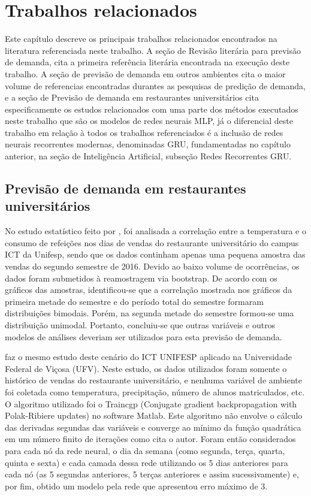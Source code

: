 \documentclass[	12pt, Times, openright, twoside, a4paper, english, brazil]{abntex2}
\begin{document}
  \chapter{Trabalhos relacionados}
    Este capítulo descreve os principais trabalhos relacionados encontrados na literatura referenciada neste trabalho.
    A seção de Revisão literária para previsão de demanda, cita a primeira referência literária encontrada na execução deste trabalho.
    A seção de previsão de demanda em outros ambientes cita o maior volume de referencias encontradas durantes as pesquisas de predição de demanda, e a seção de Previsão de demanda em restaurantes universitários cita especificamente os estudos relacionados com uma parte dos métodos executados neste trabalho que são os modelos de redes neurais MLP, já o diferencial deste trabalho em relação à todos os trabalhos referenciados é a inclusão de redes neurais recorrentes modernas, denominadas GRU, fundamentadas no capítulo anterior, na seção de Inteligência Artificial, subseção Redes Recorrentes GRU.
    
    \section{Previsão de demanda em restaurantes universitários}
         No estudo estatístico feito por \cite{Landim2016}, foi analisada a correlação entre a temperatura e o consumo de refeições nos dias de vendas do restaurante universitário do campus ICT da Unifesp, sendo que os dados continham apenas uma pequena amostra das vendas do segundo semestre de 2016. Devido ao baixo volume de ocorrências, os dados foram submetidos à reamostragem via bootstrap. De acordo com os gráficos das amostras, identificou-se que a correlação mostrada nos gráficos da primeira metade do semestre e do período total do semestre formaram distribuições bimodais. Porém, na segunda metade do semestre formou-se uma distribuição unimodal. Portanto, concluiu-se que outras variáveis e outros modelos de análises deveriam ser utilizados para esta previsão de demanda.
        
         \cite{Lopes2008} faz o mesmo estudo deste cenário do ICT UNIFESP aplicado na Universidade Federal de Viçosa (UFV). Neste estudo, os dados utilizados foram somente o histórico de vendas do restaurante universitário, e nenhuma variável de ambiente foi coletada como temperatura, precipitação, número de alunos matriculados, etc. O algoritmo utilizado foi o Traincgp (Conjugate gradient backpropagation with Polak-Ribiere updates) no software Matlab. Este algoritmo não envolve o cálculo das derivadas segundas das variáveis e converge ao mínimo da função quadrática em um número finito de iterações como cita o autor. Foram então considerados para cada nó da rede neural, o dia da semana (como segunda, terça, quarta, quinta e sexta) e cada camada dessa rede utilizando os 5 dias anteriores para cada nó (as 5 segundas anteriores, 5 terças anteriores e assim sucessivamente) e, por fim, obtido um modelo pela rede que apresentou erro máximo de 3.
        
\end{document}
